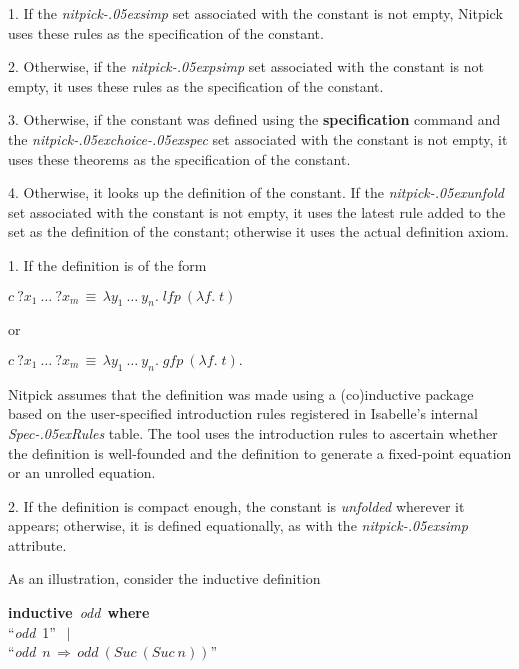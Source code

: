 \documentclass[a4paper,12pt]{article}
\renewcommand\_{\hbox{\textunderscore\kern-.05ex}}
\begin{document}
\begin{enum}
\item[1.] If the \textit{nitpick\_simp} set associated with the constant
is not empty, Nitpick uses these rules as the specification of the constant.

\item[2.] Otherwise, if the \textit{nitpick\_psimp} set associated with
the constant is not empty, it uses these rules as the specification of the
constant.

\item[3.] Otherwise, if the constant was defined using the
\allowbreak\textbf{specification} command and the
\textit{nitpick\_choice\_spec} set associated with the constant is not empty, it
uses these theorems as the specification of the constant.

\item[4.] Otherwise, it looks up the definition of the constant. If the
\textit{nitpick\_unfold} set associated with the constant is not empty, it uses
the latest rule added to the set as the definition of the constant; otherwise it
uses the actual definition axiom.

\begin{enum}
\item[1.] If the definition is of the form

\qquad $c~{?}x_1~\ldots~{?}x_m \,\equiv\, \lambda y_1~\ldots~y_n.\; \textit{lfp}~(\lambda f.\; t)$

or

\qquad $c~{?}x_1~\ldots~{?}x_m \,\equiv\, \lambda y_1~\ldots~y_n.\; \textit{gfp}~(\lambda f.\; t).$

Nitpick assumes that the definition was made using a (co)inductive package
based on the user-specified introduction rules registered in Isabelle's internal
\textit{Spec\_Rules} table. The tool uses the introduction rules to ascertain
whether the definition is well-founded and the definition to generate a
fixed-point equation or an unrolled equation.

\item[2.] If the definition is compact enough, the constant is \textsl{unfolded}
wherever it appears; otherwise, it is defined equationally, as with
the \textit{nitpick\_simp} attribute.
\end{enum}
\end{enum}

As an illustration, consider the inductive definition

\prew
\textbf{inductive}~\textit{odd}~\textbf{where} \\
``\textit{odd}~1'' $\,\mid$ \\
``\textit{odd}~$n\,\Longrightarrow\, \textit{odd}~(\textit{Suc}~(\textit{Suc}~n))$''
\postw
\end{document}
